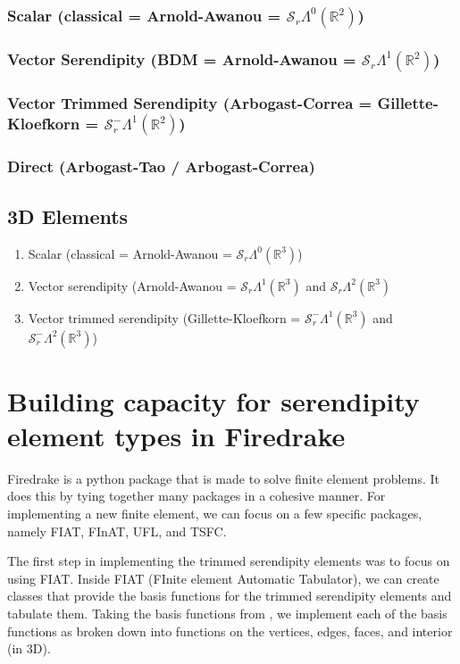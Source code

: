 \documentclass[manuscript,screen]{acmart}
\newcommand{\R}{\mathbb{R}}
\newcommand{\calS}{\mathcal{S}}
\begin{document}
  
  \subsubsection{Scalar (classical = Arnold-Awanou = $\calS_r\Lambda^0(\R^2)$)}
  
  \subsubsection{Vector Serendipity (BDM = Arnold-Awanou = $\calS_r\Lambda^1(\R^2)$)}
  
  \subsubsection{Vector Trimmed Serendipity (Arbogast-Correa = Gillette-Kloefkorn = $\calS_r^-\Lambda^1(\R^2)$)}
  
  \subsubsection{Direct (Arbogast-Tao / Arbogast-Correa)}
  
  \subsection{3D Elements}
  \begin{enumerate}
  \item Scalar (classical = Arnold-Awanou = $\calS_r\Lambda^0(\R^3)$)
  \item Vector serendipity (Arnold-Awanou = $\calS_r\Lambda^1(\R^3)$ and $\calS_r\Lambda^2(\R^3)$
  \item Vector trimmed serendipity (Gillette-Kloefkorn = $\calS_r^-\Lambda^1(\R^3)$ and $\calS_r^-\Lambda^2(\R^3)$)
  
  \end{enumerate}
  
  \section{Building capacity for serendipity element types in Firedrake}
  
  Firedrake is a python package that is made to solve finite element problems.  It does this by tying together many packages in a cohesive manner.  For implementing a new finite element, we can focus on a few specific packages, namely FIAT, FInAT, UFL, and TSFC.  
  
 The first step in implementing the trimmed serendipity elements was to focus on using FIAT.  Inside FIAT (FInite element Automatic Tabulator), we can create classes that provide the basis functions for the trimmed serendipity elements and tabulate them.  Taking the basis functions from \cite{gillette2019computational}, we implement each of the basis functions as broken down into functions on the vertices, edges, faces, and interior (in 3D).  
 
\end{document}
